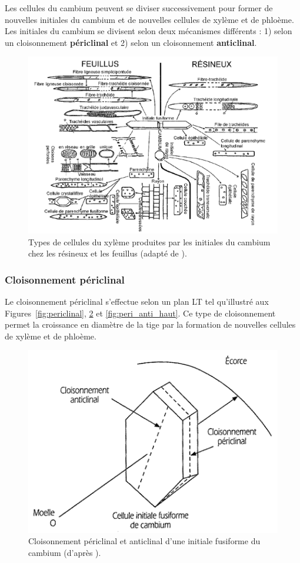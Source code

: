 Les cellules du cambium peuvent se diviser successivement pour former de nouvelles initiales du cambium et de nouvelles cellules de xylème et de phloème.  Les initiales du cambium se divisent selon deux mécanismes différents : 1) selon un cloisonnement \textbf{périclinal} et 2) selon un cloisonnement \textbf{anticlinal}.

\begin{figure}[h]
\centering
\includegraphics[width=1\textwidth]{img/ch5_cellules_resume}
\caption{Types de cellules du xylème produites par les initiales du cambium chez les résineux et les feuillus (adapté de \cite{jane1970structure}).}
\label{fig:cellules_resume}
\end{figure}

\subsubsection{Cloisonnement périclinal}

Le cloisonnement périclinal s'effectue selon un plan LT tel qu'illustré aux Figures~\ref{fig:periclinal}, \ref{fig:peri_anti} et \ref{fig:peri_anti_haut}. Ce type de cloisonnement permet la croissance en diamètre de la tige par la formation de nouvelles cellules de xylème et de phloème.

\begin{figure}[h]
\centering
\includegraphics[scale=0.8]{img/ch5_peri_anti}
\caption{Cloisonnement périclinal et anticlinal d'une initiale fusiforme du cambium (d'après \cite{doucet2009manuel}).}
\label{fig:peri_anti}
\end{figure}

